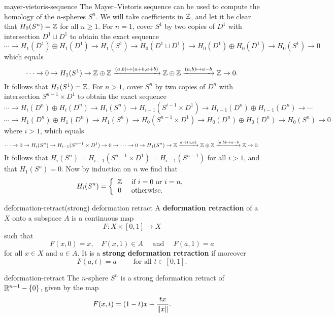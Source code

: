 \begin{example}{mayer-vietoris-sequence}
    The Mayer--Vietoris sequence can be used to compute the homology of the $n$-spheres $S^n$. We will take coefficients in $\mathbb{Z}$, and let it be clear that $H_0(S^n) = \mathbb{Z}$ for all $n \ge 1$. For $n = 1$, cover $S^1$ by two copies of $D^1$ with intersection $D^1 \sqcup D^1$ to obtain the exact sequence
    \[ \cdots \to H_1(D^1) \oplus H_1(D^1) \to H_1(S^1) \to H_0(D^1 \sqcup D^1) \to H_0(D^1) \oplus H_0(D^1) \to H_0(S^1) \to 0 \]
    which equals
    \[ \cdots \to 0 \to H_1(S^1) \to \mathbb{Z} \oplus \mathbb{Z} \xrightarrow{(a, b) \mapsto (a + b, a + b)} \mathbb{Z} \oplus \mathbb{Z} \xrightarrow{(a, b) \mapsto a - b} \mathbb{Z} \to 0 . \]
    It follows that $H_1(S^1) = \mathbb{Z}$. For $n > 1$, cover $S^n$ by two copies of $D^n$ with intersection $S^{n - 1} \times D^1$ to obtain the exact sequence
    \[ \cdots \to H_i(D^n) \oplus H_i(D^n) \to H_i(S^n) \to H_{i - 1}(S^{i - 1} \times D^1) \to H_{i - 1}(D^n) \oplus H_{i - 1}(D^n) \to \cdots \]
    \[ \cdots \to H_1(D^n) \oplus H_1(D^n) \to H_1(S^n) \to H_0(S^{n - 1} \times D^1) \to H_0(D^n) \oplus H_0(D^n) \to H_0(S^n) \to 0 \]
    where $i > 1$, which equals
    \[ \cdots \to 0 \to H_i(S^n) \to H_{i - 1}(S^{n - 1} \times D^1) \to 0 \to \cdots \to 0 \to H_1(S^n) \to \mathbb{Z} \xrightarrow{a \mapsto (a, a)} \mathbb{Z} \oplus \mathbb{Z} \xrightarrow{(a, b) \mapsto a - b} \mathbb{Z} \to 0 . \]
    It follows that $H_i(S^n) = H_{i - 1}(S^{n - 1} \times D^1) = H_{i - 1}(S^{n - 1})$ for all $i > 1$, and that $H_1(S^n) = 0$. Now by induction on $n$ we find that
    \[ H_i(S^n) = \left\{ \begin{array}{cl} \mathbb{Z} & \textup{ if } i = 0 \textup{ or } i = n , \\ 0 & \textup{ otherwise}. \end{array} \right. \]
\end{example}

\begin{topic}{deformation-retract}{(strong) deformation retract}
    A \textbf{deformation retraction} of a  $X$ onto a subspace $A$ is a continuous map
    \[ F : X \times [0, 1] \to X \]
    such that 
    \[ F(x, 0) = x, \quad F(x, 1) \in A \quad \text{ and } \quad F(a, 1) = a \]
    for all $x \in X$ and $a \in A$.
    It is a \textbf{strong deformation retraction} if moreover
    \[ F(a, t) = a \qquad \text{ for all } t \in [0, 1] . \]
\end{topic}

\begin{example}{deformation-retract}
    The $n$-sphere $S^n$ is a strong deformation retract of $\mathbb{R}^{n + 1} - \{ 0 \}$, given by the map
    \[  F(x, t) = (1 - t) x + \frac{t x}{\left\|x\right\|} . \]
\end{example}

